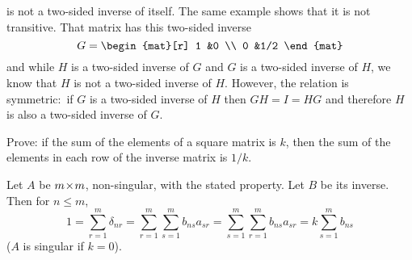 \begin{exercises}
\begin{answer}
     is not a two-sided inverse of itself.
     The same example shows that it is not transitive.
     That matrix has this two-sided inverse
     \begin{equation*}
       G=\begin{mat}[r]
         1  &0  \\
         0  &1/2
       \end{mat}
     \end{equation*}
     and while \( H \) is a two-sided inverse of \( G \) and \( G \)
     is a two-sided inverse of \( H \), we know that \( H \) is not a two-sided
     inverse of \( H \).
     However, the relation is symmetric:~if \( G \) is a two-sided inverse of 
     \( H \) then
     \( GH=I=HG \) and therefore \( H \) is also a two-sided
     inverse of \( G \).  
   \end{answer}
  \item  
    \cite{Monthly51p614}
    Prove: if the sum of the elements of a square
    matrix is \( k \), then the sum of the elements in each row of the
    inverse matrix is \( 1/k \).
    \begin{answer}
      \answerasgiven %
      Let \( A \) be \( m \! \times \! m \), non-singular, with the stated property.
      Let \( B \) be its inverse.
      Then for \( n\leq m \),
      \begin{equation*}
        1
        =\sum_{r=1}^{m}\delta_{nr}
        =\sum_{r=1}^{m}\sum_{s=1}^{m}b_{ns}a_{sr}
        =\sum_{s=1}^{m}\sum_{r=1}^{m}b_{ns}a_{sr}
        =k\sum_{s=1}^{m}b_{ns}
      \end{equation*}
      (\( A \) is singular if \( k=0 \)).  
   \end{answer}
\end{exercises}







